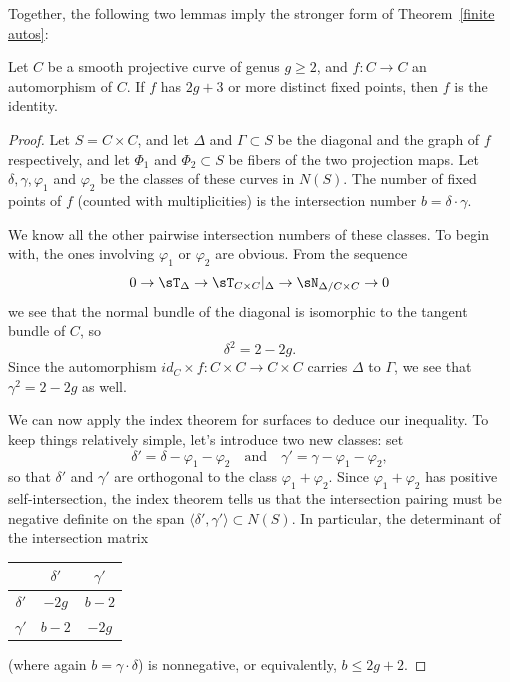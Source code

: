 Together, the following two lemmas imply the stronger form of Theorem~\ref{finite autos}:

\begin{lemma}\label{2g+3fixedpoints}
Let $C$ be a smooth projective curve of genus $g \geq 2$, and $f: C \to C$ an automorphism of $C$.
 If $f$ has $2g+3$ or more distinct fixed points, then $f$ is the identity.
\end{lemma}

\begin{proof}
Let $S = C\times C$, and let $\Delta$ and $\Gamma \subset S$ be the diagonal and the graph of $f$ respectively, and let $\Phi_1$ and $\Phi_2 \subset S$ be fibers of the two projection maps. Let $\delta, \gamma, \varphi_1$ and $\varphi_2$ be the classes of these curves in  $N(S)$. The number of fixed points of $f$ (counted with multiplicities) is the intersection number  $b = \delta \cdot \gamma$.

We know all the other pairwise intersection numbers of these classes. To begin with, the ones involving $\varphi_1$ or $\varphi_2$ are obvious. From the sequence
$$
0\to \sT_{\Delta} \to \sT_{C\times C}|_{\Delta} \to \sN_{\Delta/C\times C} \to 0
$$
we see that the normal bundle of the diagonal is isomorphic to the tangent bundle of $C$, so
$$
\delta^2 = 2 - 2g.
$$
Since the automorphism $id_C \times f : C\times C \to C \times C$ carries $\Delta$ to $\Gamma$, we see that $\gamma^2 = 2-2g$ as well.

We can now apply the index theorem for surfaces to deduce our inequality. To keep things relatively simple, let's introduce two new classes: set
$$
\delta' = \delta - \varphi_1 - \varphi_2 \quad \text{and} \quad \gamma' = \gamma - \varphi_1 - \varphi_2,
$$
so that $\delta'$ and $\gamma'$ are orthogonal to the class $\varphi_1 + \varphi_2$. Since $\varphi_1 + \varphi_2$ has positive self-intersection, the index theorem  tells us that the intersection pairing must be negative definite on the span $\langle \delta',\gamma' \rangle \subset N(S)$. In particular, the determinant of the intersection matrix
\begin{center}
\begin{tabular}{c|c|c}
& $\delta'$ &  $\gamma'$  \\
\hline
$\delta'$ & $-2g$ & $b-2$ \\
\hline
$\gamma'$ & $b-2$ & $-2g$ 
\end{tabular}
\end{center}
(where again $b = \gamma \cdot \delta$) is nonnegative, or equivalently, $b\leq 2g+2$.
\end{proof}

